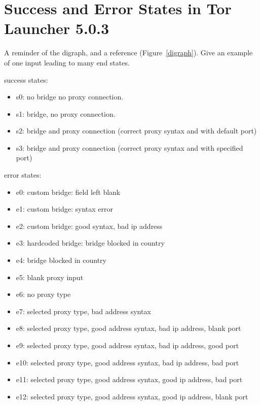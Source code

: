 \documentclass[USenglish,oneside,twocolumn]{article}
\begin{document}



\appendix

\section{Success and Error States in Tor Launcher 5.0.3} 
\label{states} 
{\color {blue} 
A reminder of the digraph, and a reference (Figure~\ref{digraph}). Give an example of one input leading to many end states. 


success states: 
\begin{itemize}
\item s0: no bridge no proxy connection.
\item s1: bridge, no proxy connection.
\item s2: bridge and proxy connection (correct proxy syntax and with default port)
\item s3: bridge and proxy connection (correct proxy syntax and with specified port)
\end{itemize}

error states:
\begin{itemize} 
\item e0: custom bridge: field left blank
\item e1: custom bridge: syntax error
\item e2: custom bridge: good syntax, bad ip address
\item e3: hardcoded bridge: bridge blocked in country
\item e4: bridge blocked in country
\item e5: blank proxy input
\item e6: no proxy type
\item e7: selected proxy type, bad address syntax
\item e8: selected proxy type, good address syntax, bad ip address, blank port
\item e9: selected proxy type, good address syntax, bad ip address, good port
\item e10: selected proxy type, good address syntax, bad ip address, bad port
\item e11: selected proxy type, good address syntax, good ip address, bad port
\item e12: selected proxy type, good address syntax, good ip address, blank port
\end{itemize} 
}
\end{document}
